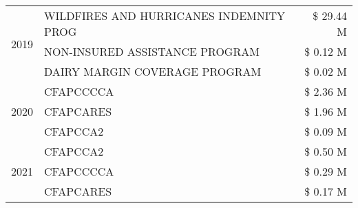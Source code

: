 \begin{tabular}{llr}
\cline{1-3}
\multirow[t]{3}{*}{2019} & WILDFIRES AND HURRICANES INDEMNITY PROG & \$ 29.44 M \\
 & NON-INSURED ASSISTANCE PROGRAM & \$ 0.12 M \\
 & DAIRY MARGIN COVERAGE PROGRAM & \$ 0.02 M \\
\cline{1-3}
\multirow[t]{3}{*}{2020} & CFAPCCCCA & \$ 2.36 M \\
 & CFAPCARES & \$ 1.96 M \\
 & CFAPCCA2 & \$ 0.09 M \\
\cline{1-3}
\multirow[t]{3}{*}{2021} & CFAPCCA2 & \$ 0.50 M \\
 & CFAPCCCCA & \$ 0.29 M \\
 & CFAPCARES & \$ 0.17 M \\
\cline{1-3}
\bottomrule
\end{tabular}
